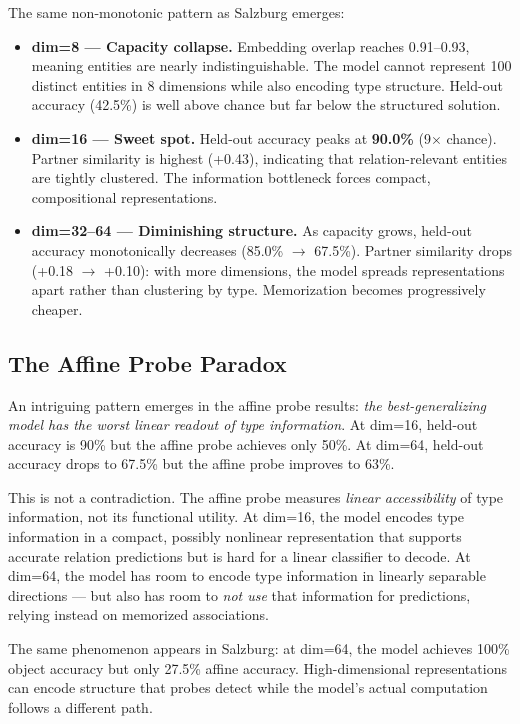 \documentclass[11pt]{article}
\begin{document}
The same non-monotonic pattern as Salzburg emerges:

\begin{itemize}
\item \textbf{dim=8 --- Capacity collapse.} Embedding overlap reaches 0.91--0.93,
  meaning entities are nearly indistinguishable. The model cannot represent 100 distinct
  entities in 8 dimensions while also encoding type structure. Held-out accuracy (42.5\%)
  is well above chance but far below the structured solution.
\item \textbf{dim=16 --- Sweet spot.} Held-out accuracy peaks at \textbf{90.0\%}
  (9$\times$ chance). Partner similarity is highest (+0.43), indicating that
  relation-relevant entities are tightly clustered. The information bottleneck forces
  compact, compositional representations.
\item \textbf{dim=32--64 --- Diminishing structure.} As capacity grows, held-out
  accuracy monotonically decreases (85.0\% $\to$ 67.5\%). Partner similarity drops
  (+0.18 $\to$ +0.10): with more dimensions, the model spreads representations apart
  rather than clustering by type. Memorization becomes progressively cheaper.
\end{itemize}

\subsection{The Affine Probe Paradox}

An intriguing pattern emerges in the affine probe results: \emph{the best-generalizing
model has the worst linear readout of type information}. At dim=16, held-out accuracy is
90\% but the affine probe achieves only 50\%. At dim=64, held-out accuracy drops to
67.5\% but the affine probe improves to 63\%.

This is not a contradiction. The affine probe measures \emph{linear accessibility} of
type information, not its functional utility. At dim=16, the model encodes type
information in a compact, possibly nonlinear representation that supports accurate
relation predictions but is hard for a linear classifier to decode. At dim=64, the
model has room to encode type information in linearly separable directions --- but
also has room to \emph{not use} that information for predictions, relying instead on
memorized associations.

The same phenomenon appears in Salzburg: at dim=64, the model achieves 100\% object
accuracy but only 27.5\% affine accuracy. High-dimensional representations can encode
structure that probes detect while the model's actual computation follows a different
path.
\end{document}
